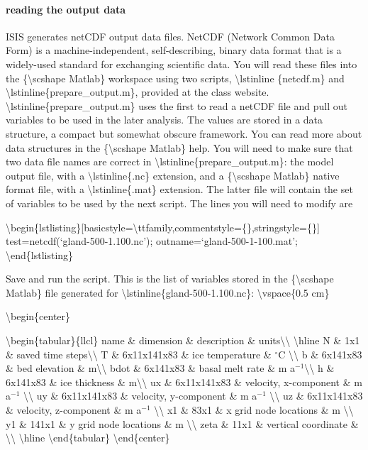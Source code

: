 \paragraph{reading the output data}

ISIS generates netCDF output data files. NetCDF (Network Common Data
Form) is a machine-independent, self-describing, binary data format that
is a widely-used standard for exchanging scientific data. You will read
these files into the \{\textbackslash{}scshape Matlab\} workspace using
two scripts, \textbackslash{}lstinline \{netcdf.m\} and
\textbackslash{}lstinline\{prepare\_output.m\}, provided at the class
website. \textbackslash{}lstinline\{prepare\_output.m\} uses the first
to read a netCDF file and pull out variables to be used in the later
analysis. The values are stored in a data structure, a compact but
somewhat obscure framework. You can read more about data structures in
the \{\textbackslash{}scshape Matlab\} help. You will need to make sure
that two data file names are correct in
\textbackslash{}lstinline\{prepare\_output.m\}: the model output file,
with a \textbackslash{}lstinline\{.nc\} extension, and a
\{\textbackslash{}scshape Matlab\} native format file, with a
\textbackslash{}lstinline\{.mat\} extension. The latter file will
contain the set of variables to be used by the next script. The lines
you will need to modify are

\textbackslash{}begin\{lstlisting\}{[}basicstyle=\textbackslash{}ttfamily,commentstyle=\{\},stringstyle=\{\}{]}
test=netcdf(`gland-500-1.100.nc'); outname=`gland-500-1-100.mat';
\textbackslash{}end\{lstlisting\}

Save and run the script. This is the list of variables stored in the
\{\textbackslash{}scshape Matlab\} file generated for
\textbackslash{}lstinline\{gland-500-1.100.nc\}:
\textbackslash{}vspace\{0.5 cm\}

\textbackslash{}begin\{center\}

\textbackslash{}begin\{tabular\}\{llcl\} name \& dimension \&
description \& units\textbackslash{}\textbackslash{}
\textbackslash{}hline N \& 1x1 \& saved time
steps\textbackslash{}\textbackslash{} T \& 6x11x141x83 \& ice
temperature \& $^{\circ}$C \textbackslash{}\textbackslash{} b \&
6x141x83 \& bed elevation \& m\textbackslash{}\textbackslash{} bdot \&
6x141x83 \& basal melt rate \& m
a$^{-1}$\textbackslash{}\textbackslash{} h \& 6x141x83 \& ice thickness
\& m\textbackslash{}\textbackslash{} ux \& 6x11x141x83 \& velocity,
x-component \& m a$^{-1}$ \textbackslash{}\textbackslash{} uy \&
6x11x141x83 \& velocity, y-component \& m a$^{-1}$
\textbackslash{}\textbackslash{} uz \& 6x11x141x83 \& velocity,
z-component \& m a$^{-1}$ \textbackslash{}\textbackslash{} x1 \& 83x1 \&
x grid node locations \& m \textbackslash{}\textbackslash{} y1 \& 141x1
\& y grid node locations \& m \textbackslash{}\textbackslash{} zeta \&
11x1 \& vertical coordinate \& \textbackslash{}\textbackslash{}
\textbackslash{}hline \textbackslash{}end\{tabular\}
\textbackslash{}end\{center\}

